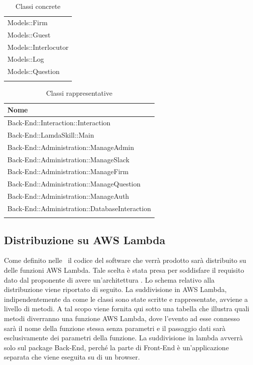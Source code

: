 \documentclass[../DefinizioneDiProdotto.tex]{subfiles}
\begin{document}
\begin{longtable}[c] { >{\centering\arraybackslash}p{13cm} }
				\addlinespace[0.3em]
				Models::Firm \\
				\addlinespace[0.3em]
				\midrule
				\addlinespace[0.3em]
				Models::Guest \\
				\addlinespace[0.3em]
				\midrule
				\addlinespace[0.3em]
				Models::Interlocutor \\
				\addlinespace[0.3em]
				\midrule
				\addlinespace[0.3em]
				Models::Log \\
				\addlinespace[0.3em]
				\midrule
				\addlinespace[0.3em]
				Models::Question \\
				\bottomrule
				\caption{Classi concrete}
			\end{longtable}

			\begin{longtable}[c] { >{\centering\arraybackslash}p{9cm} }
				\toprule
				\centerline{\textbf{Nome}} \\
				\midrule
				Back-End::Interaction::Interaction  \\
		 		\addlinespace[0.3em]
				\midrule
				\addlinespace[0.3em]
				Back-End::LamdaSkill::Main  \\
		 		\addlinespace[0.3em]
				\midrule
				\addlinespace[0.3em]
				Back-End::Administration::ManageAdmin  \\
		 		\addlinespace[0.3em]
				\midrule
				\addlinespace[0.3em]
				Back-End::Administration::ManageSlack  \\
		 		\addlinespace[0.3em]
				\midrule
				\addlinespace[0.3em]
				Back-End::Administration::ManageFirm  \\
		 		\addlinespace[0.3em]
				\midrule
				\addlinespace[0.3em]
				Back-End::Administration::ManageQuestion  \\
		 		\addlinespace[0.3em]
				\midrule
				\addlinespace[0.3em]
				Back-End::Administration::ManageAuth  \\
		 		\addlinespace[0.3em]
				\midrule
				\addlinespace[0.3em]
				Back-End::Administration::DatabaseInteraction \\
				\bottomrule
				\caption{Classi rappresentative}
		\end{longtable}

	\subsection{Distribuzione su AWS Lambda}
	Come definito nelle \normediprogettov\ il codice del software che verrà prodotto sarà distribuito su delle funzioni AWS Lambda. Tale scelta è stata presa per soddisfare il requisito dato dal proponente di avere un'architettura . Lo schema relativo alla distribuzione viene riportato di seguito.
La suddivisione in AWS Lambda, indipendentemente da come le classi sono state scritte
e rappresentate, avviene a livello di metodi. A tal scopo viene fornita qui sotto una tabella che illustra quali metodi diverranno una
funzione AWS Lambda, dove l'evento ad esse connesso sarà il nome della funzione stessa
senza parametri e il passaggio dati sarà esclusivamente dei parametri della funzione. La
suddivisione in lambda avverrà solo sul package Back-End, perché la parte di Front-End è
un'applicazione separata che viene eseguita su di un browser.
\end{document}
